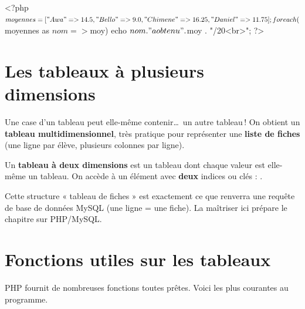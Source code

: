 \begin{codephp}
<?php
  $moyennes = [
    "Awa"     => 14.5,
    "Bello"   => 9.0,
    "Chimene" => 16.25,
    "Daniel"  => 11.75
  ];

  foreach ($moyennes as $nom => $moy) {
    echo $nom . " a obtenu " . $moy . "/20<br>";
  }
?>
\end{codephp}

\section{Les tableaux à plusieurs dimensions}

Une case d'un tableau peut elle-même contenir\dots\ un autre tableau\,! On obtient
un \textbf{tableau multidimensionnel}, très pratique pour représenter une
\textbf{liste de fiches} (une ligne par élève, plusieurs colonnes par ligne).

\begin{definition}
Un \textbf{tableau à deux dimensions} est un tableau dont chaque valeur est
elle-même un tableau. On accède à un élément avec \textbf{deux} indices ou clés :
.
\end{definition}


\begin{remarque}
Cette structure « tableau de fiches » est exactement ce que renverra une requête
de base de données MySQL (une ligne = une fiche). La maîtriser ici prépare le
chapitre sur PHP/MySQL.
\end{remarque}

\section{Fonctions utiles sur les tableaux}

PHP fournit de nombreuses fonctions toutes prêtes. Voici les plus courantes au
programme.

